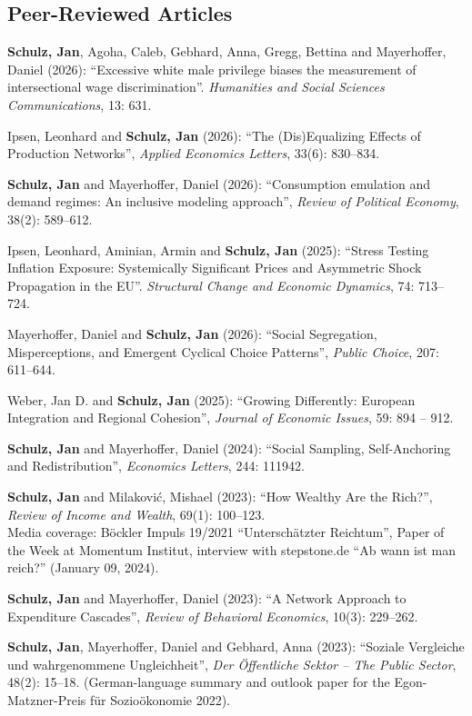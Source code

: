 \documentclass[margin]{res}
\begin{document}
\begin{resume}
	\section{Peer-Reviewed Articles}
	\textbf{Schulz, Jan}, Agoha, Caleb, Gebhard, Anna, Gregg, Bettina and Mayerhoffer, Daniel (2026): ``Excessive white male privilege biases the measurement of intersectional wage discrimination''. \textit{Humanities and Social Sciences Communications}, 13: 631.
	
	Ipsen, Leonhard and \textbf{Schulz, Jan} (2026): ``The (Dis)Equalizing Effects of Production Networks'', \emph{Applied Economics Letters}, 33(6): 830--834.
	
	\textbf{Schulz, Jan} and Mayerhoffer, Daniel (2026): ``Consumption emulation and demand regimes: An inclusive modeling approach'', \textit{Review of Political Economy}, 38(2): 589--612.
	
	Ipsen, Leonhard, Aminian, Armin and \textbf{Schulz, Jan} (2025): ``Stress Testing Inflation Exposure: Systemically Significant Prices and Asymmetric Shock Propagation in the EU''. \textit{Structural Change and Economic Dynamics}, 74: 713--724.
	
	Mayerhoffer, Daniel and \textbf{Schulz, Jan} (2026): ``Social Segregation, Misperceptions, and Emergent Cyclical Choice Patterns'', \emph{Public Choice}, 207: 611--644.
	
	Weber, Jan D. and \textbf{Schulz, Jan} (2025): ``Growing Differently: European Integration and Regional Cohesion'', \emph{Journal of Economic Issues}, 59: 894 -- 912.
	
	\textbf{Schulz, Jan} and Mayerhoffer, Daniel (2024): ``Social Sampling, Self-Anchoring and Redistribution'', \emph{Economics Letters}, 244: 111942.
	
	
	\textbf{Schulz, Jan} and Milakovi\'c, Mishael (2023): ``How Wealthy Are the Rich?'', \textit{Review of Income and Wealth}, 69(1): 100--123.\\
	Media coverage: B\"ockler Impuls 19/2021 ``Untersch\"atzter Reichtum'', Paper of the Week at Momentum Institut, interview with stepstone.de ``Ab wann ist man reich?'' (January 09, 2024).
	
	\textbf{Schulz, Jan} and Mayerhoffer, Daniel (2023): ``A Network Approach to Expenditure Cascades'', \emph{Review of Behavioral Economics}, 10(3): 229--262.
	
	\textbf{Schulz, Jan}, Mayerhoffer, Daniel and Gebhard, Anna (2023): ``Soziale Vergleiche und wahrgenommene Ungleichheit'', \textit{Der \"Offentliche Sektor -- The Public Sector}, 48(2): 15--18. (German-language summary and outlook paper for the Egon-Matzner-Preis f\"ur Sozio\"okonomie 2022).
	

\end{resume}
\end{document}
